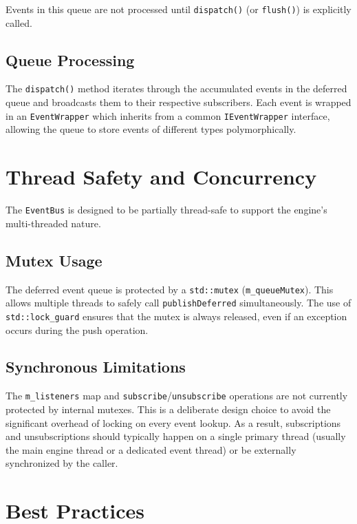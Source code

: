 Events in this queue are not processed until \texttt{dispatch()} (or \texttt{flush()}) is explicitly called.

\subsection{Queue Processing}
The \texttt{dispatch()} method iterates through the accumulated events in the deferred queue and broadcasts them to their respective subscribers. Each event is wrapped in an \texttt{EventWrapper} which inherits from a common \texttt{IEventWrapper} interface, allowing the queue to store events of different types polymorphically.

\section{Thread Safety and Concurrency}

The \texttt{EventBus} is designed to be partially thread-safe to support the engine's multi-threaded nature.

\subsection{Mutex Usage}
The deferred event queue is protected by a \texttt{std::mutex} (\texttt{m\_queueMutex}). This allows multiple threads to safely call \texttt{publishDeferred} simultaneously. The use of \texttt{std::lock\_guard} ensures that the mutex is always released, even if an exception occurs during the push operation.

\subsection{Synchronous Limitations}
The \texttt{m\_listeners} map and \texttt{subscribe}/\texttt{unsubscribe} operations are not currently protected by internal mutexes. This is a deliberate design choice to avoid the significant overhead of locking on every event lookup. As a result, subscriptions and unsubscriptions should typically happen on a single primary thread (usually the main engine thread or a dedicated event thread) or be externally synchronized by the caller.

\section{Best Practices}

